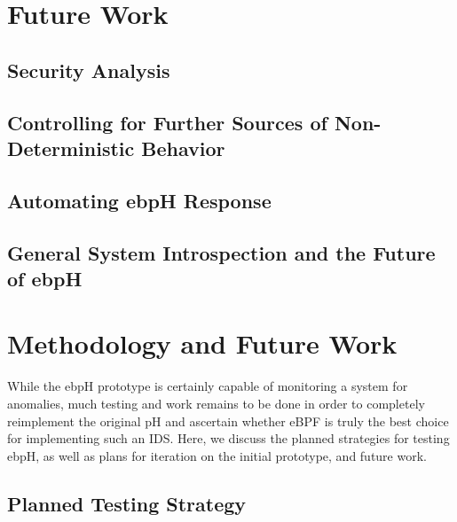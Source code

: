 \documentclass[
  12pt]{findlay}
\begin{document}
\hypertarget{future-work}{%
\section{Future Work}\label{future-work}}

\hypertarget{security-analysis}{%
\subsection{Security Analysis}\label{security-analysis}}

\hypertarget{controlling-for-further-sources-of-non-deterministic-behavior}{%
\subsection{Controlling for Further Sources of Non-Deterministic
Behavior}\label{controlling-for-further-sources-of-non-deterministic-behavior}}

\hypertarget{automating-ebph-response}{%
\subsection{Automating ebpH Response}\label{automating-ebph-response}}

\hypertarget{general-system-introspection-and-the-future-of-ebph}{%
\subsection{General System Introspection and the Future of
ebpH}\label{general-system-introspection-and-the-future-of-ebph}}

\hypertarget{methodology-and-future-work}{%
\section{Methodology and Future
Work}\label{methodology-and-future-work}}

While the ebpH prototype is certainly capable of monitoring a system for
anomalies, much testing and work remains to be done in order to
completely reimplement the original pH and ascertain whether eBPF is
truly the best choice for implementing such an IDS. Here, we discuss the
planned strategies for testing ebpH, as well as plans for iteration on
the initial prototype, and future work.

\hypertarget{planned-testing-strategy}{%
\subsection{Planned Testing Strategy}\label{planned-testing-strategy}}
\end{document}
